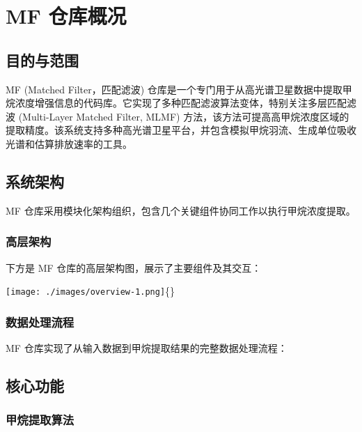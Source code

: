 \section{MF 仓库概况}\label{mf-ux4ed3ux5e93ux6982ux51b5}

\subsection{目的与范围}\label{ux76eeux7684ux4e0eux8303ux56f4}

MF (Matched Filter，匹配滤波)
仓库是一个专门用于从高光谱卫星数据中提取甲烷浓度增强信息的代码库。它实现了多种匹配滤波算法变体，特别关注多层匹配滤波
(Multi-Layer Matched Filter, MLMF)
方法，该方法可提高高甲烷浓度区域的提取精度。该系统支持多种高光谱卫星平台，并包含模拟甲烷羽流、生成单位吸收光谱和估算排放速率的工具。

\subsection{系统架构}\label{ux7cfbux7edfux67b6ux6784}

MF 仓库采用模块化架构组织，包含几个关键组件协同工作以执行甲烷浓度提取。

\subsubsection{高层架构}\label{ux9ad8ux5c42ux67b6ux6784}

下方是 MF 仓库的高层架构图，展示了主要组件及其交互：

\texttt{[image: ./images/overview-1.png]}\{\}

\subsubsection{数据处理流程}\label{ux6570ux636eux5904ux7406ux6d41ux7a0b}

MF 仓库实现了从输入数据到甲烷提取结果的完整数据处理流程：

\subsection{核心功能}\label{ux6838ux5fc3ux529fux80fd}

\subsubsection{甲烷提取算法}\label{ux7532ux70f7ux63d0ux53d6ux7b97ux6cd5}

